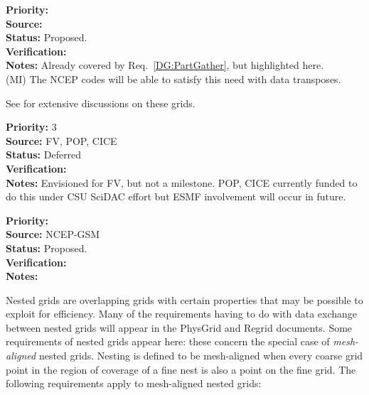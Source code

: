 \begin{reqlist}
{\bf Priority:} \\
{\bf Source:} \\
{\bf Status:} Proposed. \\
{\bf Verification:} \\
{\bf Notes:} Already covered by Req.~\ref{DG:PartGather}, but
  highlighted here.
  \\ (MI) The NCEP codes will be able to satisfy this need with data transposes.
\end{reqlist}



See \cite{art:heikes+:geodesic,art:majewski+:gme} for extensive
discussions on these grids.

\begin{reqlist}
{\bf Priority:} 3 \\ 
{\bf Source:} FV, POP, CICE \\
{\bf Status:} Deferred \\
{\bf Verification:} \\
{\bf Notes:} Envisioned for FV, but not a milestone.  POP, CICE
             currently funded to do this under CSU SciDAC effort
             but ESMF involvement will occur in future.
\end{reqlist}


\begin{reqlist}
{\bf Priority:} \\
{\bf Source:} NCEP-GSM \\
{\bf Status:} Proposed. \\
{\bf Verification:} \\
{\bf Notes:}
\end{reqlist}


Nested grids are overlapping grids with certain properties that may be
possible to exploit for efficiency. Many of the requirements having to
do with data exchange between nested grids will appear in the PhysGrid
and Regrid documents. Some requirements of nested grids appear here:
these concern the special case of \emph{mesh-aligned} nested
grids. Nesting is defined to be mesh-aligned when every coarse grid
point in the region of coverage of a fine nest is also a point on the
fine grid. The following requirements apply to mesh-aligned nested
grids:


